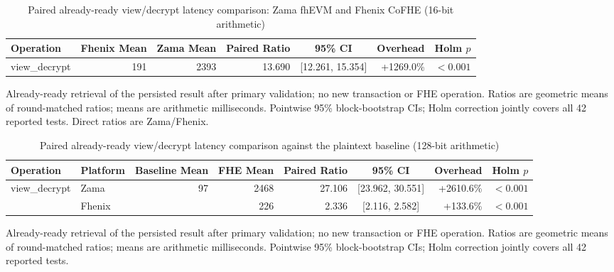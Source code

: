 \begin{table}[!t]
\caption{Paired already-ready view/decrypt latency comparison: Zama fhEVM and Fhenix CoFHE (16-bit arithmetic)}
\label{tab:zama-fhenix-lifecycle-comparison-view-16}
\centering
\footnotesize
\setlength{\tabcolsep}{5pt}
\begin{tabular}{|l|r|r|r|c|r|r|}
\hline
\textbf{Operation} & \textbf{Fhenix Mean} & \textbf{Zama Mean} & \textbf{Paired Ratio} & \textbf{95\% CI} & \textbf{Overhead} & \textbf{Holm \(p\)} \\
\hline
view\_decrypt & 191 & 2393 & 13.690 & [12.261, 15.354] & +1269.0\% & $<0.001$ \\
\hline
\end{tabular}
\vspace{2pt}
\parbox{\textwidth}{\scriptsize Already-ready retrieval of the persisted result after primary validation; no new transaction or FHE operation. Ratios are geometric means of round-matched ratios; means are arithmetic milliseconds. Pointwise 95\% block-bootstrap CIs; Holm correction jointly covers all 42 reported tests. Direct ratios are Zama/Fhenix.}
\end{table}

\begin{table}[!t]
\caption{Paired already-ready view/decrypt latency comparison against the plaintext baseline (128-bit arithmetic)}
\label{tab:paired-lifecycle-comparison-view-128}
\centering
\footnotesize
\setlength{\tabcolsep}{5pt}
\begin{tabular}{|l|l|r|r|r|c|r|r|}
\hline
\textbf{Operation} & \textbf{Platform} & \textbf{Baseline Mean} & \textbf{FHE Mean} & \textbf{Paired Ratio} & \textbf{95\% CI} & \textbf{Overhead} & \textbf{Holm \(p\)} \\
\hline
\multirow{2}{*}{view\_decrypt}
& Zama & \multirow{2}{*}{97} & 2468 & 27.106 & [23.962, 30.551] & +2610.6\% & $<0.001$ \\
& Fhenix &  & 226 & 2.336 & [2.116, 2.582] & +133.6\% & $<0.001$ \\
\hline
\hline
\end{tabular}
\vspace{2pt}
\parbox{\textwidth}{\scriptsize Already-ready retrieval of the persisted result after primary validation; no new transaction or FHE operation. Ratios are geometric means of round-matched ratios; means are arithmetic milliseconds. Pointwise 95\% block-bootstrap CIs; Holm correction jointly covers all 42 reported tests.}
\end{table}

